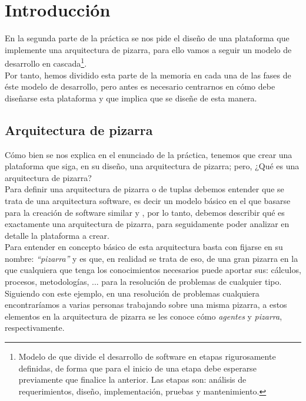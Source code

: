 \chapter{Introducción}
\lettrine[lines=1,slope=4pt,findent=0pt]{E}{}n la segunda parte de la práctica se nos pide el diseño de una plataforma que implemente una arquitectura de pizarra, para ello vamos a seguir un modelo de desarrollo en cascada\footnote{Modelo de que divide el desarrollo de software en etapas rigurosamente definidas, de forma que para el inicio de una etapa debe esperarse previamente que finalice la anterior. Las etapas son: análisis de requerimientos, diseño, implementación, pruebas y mantenimiento.}.\\

Por tanto, hemos dividido esta parte de la memoria en cada una de las fases de éste modelo de desarrollo, pero antes es necesario centrarnos en cómo debe diseñarse esta plataforma y que implica que se diseñe de esta manera.

\section{Arquitectura de pizarra}
Cómo bien se nos explica en el enunciado de la práctica, tenemos que crear una plataforma que siga, en su diseño, una arquitectura de pizarra; pero, ¿Qué es una arquitectura de pizarra?\\

Para definir una arquitectura de pizarra o de tuplas debemos entender que se trata de una arquitectura software, es decir un modelo básico en el que basarse para la creación de software similar y , por lo tanto, debemos describir qué es exactamente una arquitectura de pizarra, para seguidamente poder analizar en detalle la plataforma a crear.\\

Para entender en concepto básico de esta arquitectura basta con fijarse en su nombre: \emph{\textquotedblleft pizarra\textquotedblright} y es que, en realidad se trata de eso, de una gran pizarra en la que cualquiera que tenga los conocimientos necesarios puede aportar sus: cálculos, procesos, metodologías, ... para la resolución de problemas de cualquier tipo.\\

Siguiendo con este ejemplo, en una resolución de problemas cualquiera encontraríamos a varias personas trabajando sobre una misma pizarra, a estos elementos en la arquitectura de pizarra se les conoce cómo \emph{agentes} y \emph{pizarra}, respectivamente.\\

